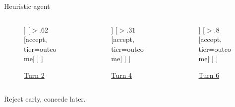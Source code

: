\documentclass[aspectratio=169]{beamer}
\begin{document}
\begin{frame}[t]{Heuristic agent}
\begin{columns}
    \begin{column}[t]{0.33\linewidth}
    \begin{figure}
    \caption*{\underline{Turn 2}}
    \begin{forest}
	[\texttt{elapsed}
    	[$\le .62$ 
    		[reject, tier=outcome] 
    	]
    	[$>.62$ 
    		[accept, tier=outcome] 
		] 
	]
	\end{forest}
    \end{figure}
	\end{column}

    \begin{column}[t]{0.33\linewidth}
    \begin{figure}
    \caption*{\underline{Turn 4}}
    \begin{forest}
	[\texttt{elapsed}
    	[$\le .31$ 
    		[counter, tier=outcome]
    	]
    	[$>.31$ 
    		[accept, tier=outcome]
		] 
	]
	\end{forest}
    \end{figure}
    \end{column}
    
    \begin{column}[t]{0.33\linewidth}
	\begin{figure}
    \caption*{\underline{Turn 6}}
    \begin{forest}
	[$\texttt{offer}_1$
    	[$\le .8$ 
    		[counter, tier=outcome] 
    	]
    	[$>.8$ 
    		[accept, tier=outcome]
		] 
	]
	\end{forest}
    \end{figure}    
    \end{column}
\end{columns}\pause
\vspace{15mm}
Reject early, concede later.
\end{frame}
\end{document}
